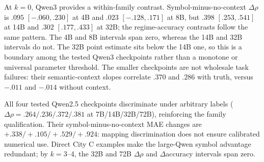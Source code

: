 \begin{center}
\begin{minipage}{\linewidth}
\centering
{}
\label{tab:coin-city-symbol-context}
\scriptsize
\setlength{\tabcolsep}{2.2pt}

\end{minipage}
\end{center}

\begin{center}
\begin{minipage}{\linewidth}
\centering
{}
\label{tab:coin-city-symbol-scaling}
\scriptsize
\setlength{\tabcolsep}{2.2pt}
\resizebox{\linewidth}{!}{}
\end{minipage}
\end{center}

At $k=0$, Qwen3 provides a within-family contrast.
Symbol-minus-no-context $\Delta\rho$ is $.095$ $[-.060,.230]$ at 4B and $.023$
$[-.128,.171]$ at 8B, but $.398$ $[.253,.541]$ at 14B and $.302$ $[.177,.433]$
at 32B; the regime-accuracy contrasts follow the same pattern. The 4B and 8B
intervals span zero, whereas the 14B and 32B intervals do not. The 32B point
estimate sits below the 14B one, so this is a boundary among the tested Qwen3
checkpoints rather than a monotone or universal parameter threshold. The smaller checkpoints are not wholesale task
failures: their semantic-context slopes correlate $.370$ and $.286$ with truth,
versus $-.011$ and $-.014$ without context.

All four tested Qwen2.5 checkpoints discriminate under arbitrary labels
($\Delta\rho=.264/.236/.372/.381$ at 7B/14B/32B/72B), reinforcing the family
qualification. Their symbol-minus-no-context MAE changes are
$+.338/+.105/+.529/+.924$: mapping discrimination does not ensure calibrated
numerical use. Direct City C examples
make the large-Qwen symbol advantage redundant; by $k=3$--4, the 32B and 72B
$\Delta\rho$ and $\Delta$accuracy intervals span zero.

